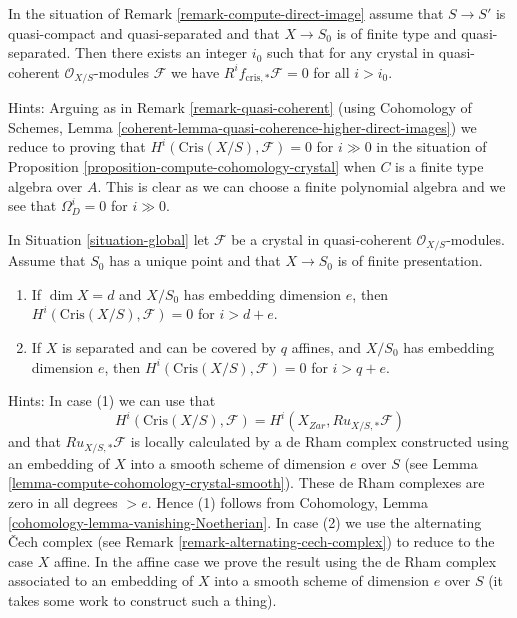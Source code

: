 \begin{remark}[Boundedness]
\label{remark-bounded-cohomology}
In the situation of Remark \ref{remark-compute-direct-image}
assume that $S \to S'$ is quasi-compact and quasi-separated and
that $X \to S_0$ is of finite type and quasi-separated. Then there exists
an integer $i_0$ such that for any crystal
in quasi-coherent $\mathcal{O}_{X/S}$-modules $\mathcal{F}$
we have $R^if_{\text{cris}, *}\mathcal{F} = 0$ for all $i > i_0$.

\medskip\noindent
Hints: Arguing as in Remark \ref{remark-quasi-coherent} (using
Cohomology of Schemes, Lemma
\ref{coherent-lemma-quasi-coherence-higher-direct-images})
we reduce to proving that $H^i(\text{Cris}(X/S), \mathcal{F}) = 0$ for $i \gg 0$
in the situation of Proposition \ref{proposition-compute-cohomology-crystal}
when $C$ is a finite type algebra over $A$. This is clear as we can
choose a finite polynomial algebra and we see that $\Omega^i_D = 0$
for $i \gg 0$.
\end{remark}

\begin{remark}
\label{remark-bounded-cohomology-over-point}
In Situation \ref{situation-global} let $\mathcal{F}$ be a crystal in
quasi-coherent $\mathcal{O}_{X/S}$-modules. Assume that $S_0$
has a unique point and that $X \to S_0$ is of finite presentation.
\begin{enumerate}
\item If $\dim X = d$ and $X/S_0$ has embedding dimension $e$, then
$H^i(\text{Cris}(X/S), \mathcal{F}) = 0$ for $i > d + e$.
\item If $X$ is separated and can be covered by $q$ affines, and
$X/S_0$ has embedding dimension $e$, then
$H^i(\text{Cris}(X/S), \mathcal{F}) = 0$ for $i > q + e$.
\end{enumerate}

\medskip\noindent
Hints: In case (1) we can use that
$$
H^i(\text{Cris}(X/S), \mathcal{F}) = H^i(X_{Zar}, Ru_{X/S, *}\mathcal{F})
$$
and that $Ru_{X/S, *}\mathcal{F}$ is locally calculated by a de Rham
complex constructed using an embedding of $X$ into a smooth scheme
of dimension $e$ over $S$
(see Lemma \ref{lemma-compute-cohomology-crystal-smooth}).
These de Rham complexes are zero in all degrees $>e$. Hence (1)
follows from Cohomology, Lemma \ref{cohomology-lemma-vanishing-Noetherian}.
In case (2) we use the alternating {\v C}ech complex (see
Remark \ref{remark-alternating-cech-complex}) to reduce to the case
$X$ affine. In the affine case we prove the result using the de Rham complex
associated to an embedding of $X$ into a smooth scheme of dimension $e$
over $S$ (it takes some work to construct such a thing).
\end{remark}

